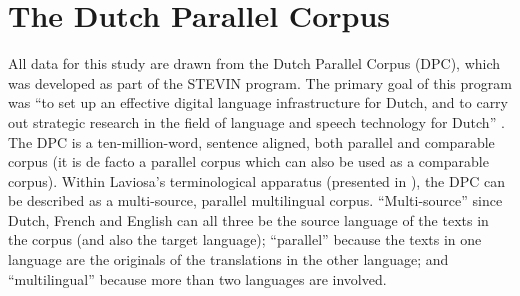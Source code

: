 \section{The Dutch Parallel Corpus}
\label{sec:3.3}
All data for this study are drawn from the Dutch Parallel Corpus (DPC), which was developed as part of the STEVIN program. The primary goal of this program was “to set up an effective digital language infrastructure for Dutch, and to carry out strategic research in the field of language and speech technology for Dutch” \citep[1]{Spyns2013}. The DPC is a ten-million-word, sentence aligned, both parallel and comparable corpus (it is de facto a parallel corpus which can also be used as a comparable corpus). Within Laviosa’s terminological apparatus (presented in ), the DPC can be described as a multi-source, parallel multilingual corpus. ``Multi-source'' since Dutch, French and English can all three be the source language of the texts in the corpus (and also the target language); ``parallel'' because the texts in one language are the originals of the translations in the other language; and ``multilingual'' because more than two languages are involved.

